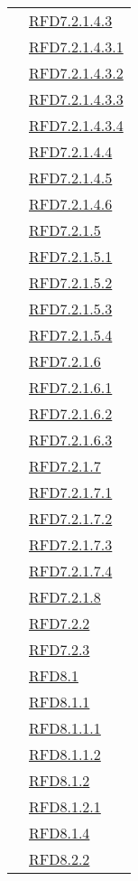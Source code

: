 \begin{longtable}{|>{\centering}m{5cm}|m{5cm}<{\centering}|}
& \hyperlink{RFD7.2.1.4.3}{RFD7.2.1.4.3}\\
& \hyperlink{RFD7.2.1.4.3.1}{RFD7.2.1.4.3.1}\\
& \hyperlink{RFD7.2.1.4.3.2}{RFD7.2.1.4.3.2}\\
& \hyperlink{RFD7.2.1.4.3.3}{RFD7.2.1.4.3.3}\\
& \hyperlink{RFD7.2.1.4.3.4}{RFD7.2.1.4.3.4}\\
& \hyperlink{RFD7.2.1.4.4}{RFD7.2.1.4.4}\\
& \hyperlink{RFD7.2.1.4.5}{RFD7.2.1.4.5}\\
& \hyperlink{RFD7.2.1.4.6}{RFD7.2.1.4.6}\\
& \hyperlink{RFD7.2.1.5}{RFD7.2.1.5}\\
& \hyperlink{RFD7.2.1.5.1}{RFD7.2.1.5.1}\\
& \hyperlink{RFD7.2.1.5.2}{RFD7.2.1.5.2}\\
& \hyperlink{RFD7.2.1.5.3}{RFD7.2.1.5.3}\\
& \hyperlink{RFD7.2.1.5.4}{RFD7.2.1.5.4}\\
& \hyperlink{RFD7.2.1.6}{RFD7.2.1.6}\\
& \hyperlink{RFD7.2.1.6.1}{RFD7.2.1.6.1}\\
& \hyperlink{RFD7.2.1.6.2}{RFD7.2.1.6.2}\\
& \hyperlink{RFD7.2.1.6.3}{RFD7.2.1.6.3}\\
& \hyperlink{RFD7.2.1.7}{RFD7.2.1.7}\\
& \hyperlink{RFD7.2.1.7.1}{RFD7.2.1.7.1}\\
& \hyperlink{RFD7.2.1.7.2}{RFD7.2.1.7.2}\\
& \hyperlink{RFD7.2.1.7.3}{RFD7.2.1.7.3}\\
& \hyperlink{RFD7.2.1.7.4}{RFD7.2.1.7.4}\\
& \hyperlink{RFD7.2.1.8}{RFD7.2.1.8}\\
& \hyperlink{RFD7.2.2}{RFD7.2.2}\\
& \hyperlink{RFD7.2.3}{RFD7.2.3}\\
& \hyperlink{RFD8.1}{RFD8.1}\\
& \hyperlink{RFD8.1.1}{RFD8.1.1}\\
& \hyperlink{RFD8.1.1.1}{RFD8.1.1.1}\\
& \hyperlink{RFD8.1.1.2}{RFD8.1.1.2}\\
& \hyperlink{RFD8.1.2}{RFD8.1.2}\\
& \hyperlink{RFD8.1.2.1}{RFD8.1.2.1}\\
& \hyperlink{RFD8.1.4}{RFD8.1.4}\\
& \hyperlink{RFD8.2.2}{RFD8.2.2}\\

\end{longtable}
